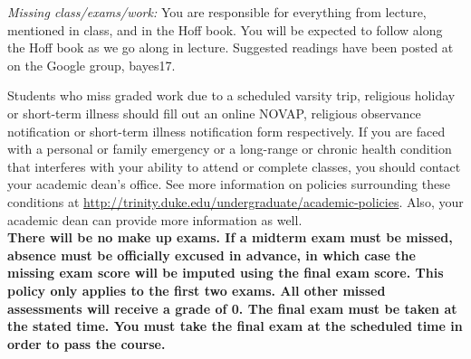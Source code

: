 \documentclass[11pt]{article}
\begin{document}
%
%
%





\emph{Missing class/exams/work:}
You are responsible for everything from lecture, mentioned in class, and in the Hoff book. You will be expected to follow along the Hoff book as we go along in lecture. Suggested readings have been posted at on the Google group, bayes17.

Students who miss graded work due to a scheduled varsity trip, religious holiday or short-term illness should fill out an online NOVAP, religious observance notification or short-term illness notification form respectively. If you are faced with a personal or family emergency or a long-range or chronic health condition that interferes with your ability to attend or complete classes, you should contact your academic dean's office. See more information on policies surrounding these conditions at \url{http://trinity.duke.edu/undergraduate/academic-policies}. Also, your academic dean can provide more information as well.\\

\textbf{There will be no make up exams. If a midterm exam must be missed, absence must be officially excused in advance, in which case the missing exam score will be imputed using the final exam score. This policy only applies to the first \textbf{two} exams. All other missed assessments will receive a grade of 0. The final exam must be taken at the stated time. You must take the final exam at the scheduled time in order to pass the course.}\\
\end{document}
